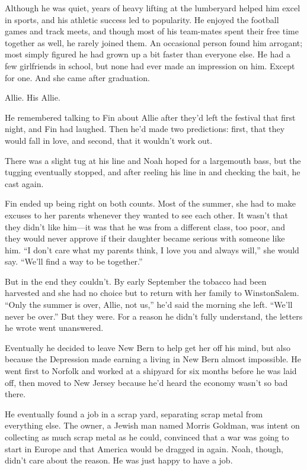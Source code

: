 \documentclass[10pt, twoside, openright]{book}
\begin{document}
Although he was quiet, years of heavy lifting at the lumberyard helped
him excel in sports, and his athletic success led to popularity. He
enjoyed the football games and track meets, and though most of his
team-mates spent their free time together as well, he rarely joined
them. An occasional person found him arrogant; most simply figured he
had grown up a bit faster than everyone else. He had a few girlfriends
in school, but none had ever made an impression on him. Except for one.
And she came after graduation.


Allie. His Allie.


He remembered talking to Fin about Allie after they'd left the festival
that first night, and Fin had laughed. Then he'd made two predictions:
first, that they would fall in love, and second, that it wouldn't work
out.

There was a slight tug at his line and Noah hoped for a largemouth bass,
but the tugging eventually stopped, and after reeling his line in and
checking the bait, he cast again.

Fin ended up being right on both counts. Most of the summer, she had to
make excuses to her parents whenever they wanted to see each other. It
wasn't that they didn't like him---it was that he was from a different
class, too poor, and they would never approve if their daughter became
serious with someone like him. ``I don't care what my parents think, I
love you and always will,'' she would say. ``We'll find a way to be
together.''

But in the end they couldn't. By early September the tobacco had been
harvested and she had no choice but to return with her family to
WinstonSalem. ``Only the summer is over, Allie, not us,'' he'd said the
morning she left. ``We'll never be over.'' But they were. For a reason
he didn't fully understand, the letters he wrote went unanswered.

Eventually he decided to leave New Bern to help get her off his mind,
but also because the Depression made earning a living in New Bern almost
impossible. He went first to Norfolk and worked at a shipyard for six
months before he was laid off, then moved to New Jersey because he'd
heard the economy wasn't so bad there.

He eventually found a job in a scrap yard, separating scrap metal from
everything else. The owner, a Jewish man named Morris Goldman, was
intent on collecting as much scrap metal as he could, convinced that a
war was going to start in Europe and that America would be dragged in
again. Noah, though, didn't care about the reason. He was just happy to
have a job.
\end{document}
